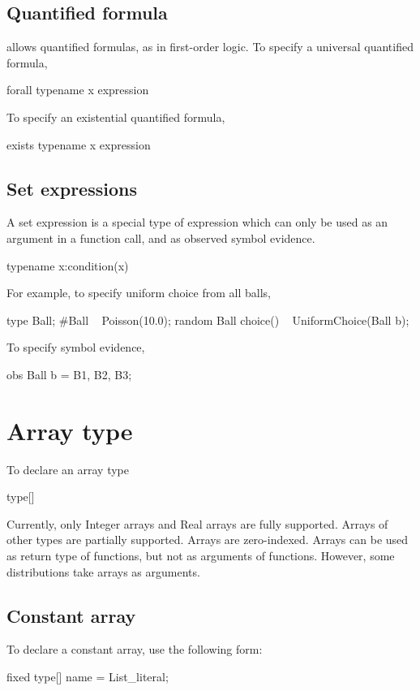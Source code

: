 \documentclass[12pt]{article}
\begin{document}
\subsection{Quantified formula}
\bl allows quantified formulas, as in first-order logic. To specify a universal quantified formula, 
\begin{blogcode}
forall typename x expression
\end{blogcode}
To specify an existential quantified formula,
\begin{blogcode}
exists typename x expression
\end{blogcode}

\subsection{Set expressions}
A set expression is a special type of expression which can only be used as an argument in a function call, and as observed symbol evidence. 
\begin{blogcode}
{typename x:condition(x)}
\end{blogcode}

For example, to specify uniform choice from all balls,
\begin{blogcode}
type Ball;
#Ball ~ Poisson(10.0);
random Ball choice() ~ UniformChoice({Ball b});
\end{blogcode}

To specify symbol evidence,
\begin{blogcode}
obs {Ball b} = {B1, B2, B3};
\end{blogcode}

\section{Array type}
To declare an array type
\begin{blogcode}
type[]
\end{blogcode}

Currently, only Integer arrays and Real arrays are fully supported. Arrays of other types are partially supported. Arrays are zero-indexed. Arrays can be used as return type of functions, but not as arguments of functions. However, some distributions take arrays as arguments.

\subsection{Constant array}
To declare a constant array, use the following form:
\begin{blogcode}
fixed type[] name = List_literal;
\end{blogcode}
\end{document}
